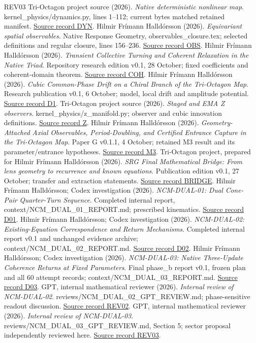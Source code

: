 \documentclass[11pt,a4paper]{article}
\begin{document}
\clearpage
\begin{thebibliography}{REV03}
 Tri-Octagon project source (2026). \emph{Native deterministic nonlinear map}. kernel\_physics/dynamics.py, lines 1–112; current bytes matched retained manifest. \href{../EVIDENCE_INDEX.md\#dyn}{Source record DYN}.
 Hilmir Frímann Halldórsson (2026). \emph{Equivariant spatial observables}. Native Response Geometry, observables\_closure.tex; selected definitions and regular closure, lines 156–236. \href{../EVIDENCE_INDEX.md\#obs}{Source record OBS}.
 Hilmir Frímann Halldórsson (2026). \emph{Transient Collective Turning and Coherent Relaxation in the Native Triad}. Repository research edition v0.1, 28 October; fixed coefficients and coherent-domain theorem. \href{../EVIDENCE_INDEX.md\#coh}{Source record COH}.
 Hilmir Frímann Halldórsson (2026). \emph{Cubic Common-Phase Drift on a Chiral Branch of the Tri-Octagon Map}. Research publication v0.1, 6 October; model, local drift and amplitude potential. \href{../EVIDENCE_INDEX.md\#d1}{Source record D1}.
 Tri-Octagon project source (2026). \emph{Staged and EMA Z observers}. kernel\_physics/z\_manifold.py; observer and cubic innovation definitions. \href{../EVIDENCE_INDEX.md\#z}{Source record Z}.
 Hilmir Frímann Halldórsson (2026). \emph{Geometry-Attached Axial Observables, Period-Doubling, and Certified Entrance Capture in the Tri-Octagon Map}. Paper G v0.1.1, 4 October; retained M3 result and its parameter/entrance hypotheses. \href{../EVIDENCE_INDEX.md\#m3}{Source record M3}.
 Tri-Octagon project, prepared for Hilmir Frímann Halldórsson (2026). \emph{SRG Final Mathematical Bridge: From lens geometry to recurrence and known equations}. Publication edition v0.1, 27 October; transfer and extraction statements. \href{../EVIDENCE_INDEX.md\#bridge}{Source record BRIDGE}.
 Hilmir Frímann Halldórsson; Codex investigation (2026). \emph{NCM-DUAL-01: Dual Cone-Pair Quarter-Turn Sequence}. Completed internal report, context/NCM\_DUAL\_01\_REPORT.md; prescribed kinematics. \href{../EVIDENCE_INDEX.md\#d01}{Source record D01}.
 Hilmir Frímann Halldórsson; Codex investigation (2026). \emph{NCM-DUAL-02: Existing-Equation Correspondence and Return Mechanisms}. Completed internal report v0.1 and unchanged evidence archive; context/NCM\_DUAL\_02\_REPORT.md. \href{../EVIDENCE_INDEX.md\#d02}{Source record D02}.
 Hilmir Frímann Halldórsson; Codex investigation (2026). \emph{NCM-DUAL-03: Native Three-Update Coherence Returns at Fixed Parameters}. Final phase\_b report v0.1, frozen plan and all 60 attempt records; context/NCM\_DUAL\_03\_REPORT.md. \href{../EVIDENCE_INDEX.md\#d03}{Source record D03}.
 GPT, internal mathematical reviewer (2026). \emph{Internal review of NCM-DUAL-02}. reviews/NCM\_DUAL\_02\_GPT\_REVIEW.md; phase-sensitive readout discussion. \href{../EVIDENCE_INDEX.md\#rev02}{Source record REV02}.
 GPT, internal mathematical reviewer (2026). \emph{Internal review of NCM-DUAL-03}. reviews/NCM\_DUAL\_03\_GPT\_REVIEW.md, Section 5; sector proposal independently reviewed here. \href{../EVIDENCE_INDEX.md\#rev03}{Source record REV03}.
\end{thebibliography}
\end{document}
